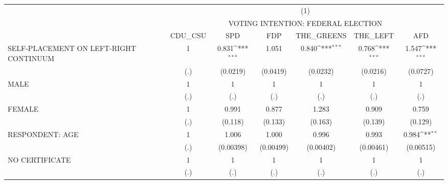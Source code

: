 {
\def\sym#1{\ifmmode^{#1}\else\(^{#1}\)\fi}
\begin{tabular}{l*{6}{c}}
\hline\hline
                              &\multicolumn{6}{c}{(1)}                                                                                                \\
                              &\multicolumn{6}{c}{VOTING INTENTION: FEDERAL ELECTION}                                                                 \\
                              &   CDU\_CSU         &       SPD         &       FDP         &THE\_GREENS         &  THE\_LEFT         &       AFD         \\
\hline
SELF-PLACEMENT ON LEFT-RIGHT CONTINUUM&         1         &     0.831\sym{***}&     1.051         &     0.840\sym{***}&     0.768\sym{***}&     1.547\sym{***}\\
                              &       (.)         &  (0.0219)         &  (0.0419)         &  (0.0232)         &  (0.0216)         &  (0.0727)         \\
[1em]
MALE                          &         1         &         1         &         1         &         1         &         1         &         1         \\
                              &       (.)         &       (.)         &       (.)         &       (.)         &       (.)         &       (.)         \\
[1em]
FEMALE                        &         1         &     0.991         &     0.877         &     1.283         &     0.909         &     0.759         \\
                              &       (.)         &   (0.118)         &   (0.133)         &   (0.163)         &   (0.139)         &   (0.129)         \\
[1em]
RESPONDENT: AGE               &         1         &     1.006         &     1.000         &     0.996         &     0.993         &     0.984\sym{**} \\
                              &       (.)         & (0.00398)         & (0.00499)         & (0.00402)         & (0.00461)         & (0.00515)         \\
[1em]
NO CERTIFICATE                &         1         &         1         &         1         &         1         &         1         &         1         \\
                              &       (.)         &       (.)         &       (.)         &       (.)         &       (.)         &       (.)         \\

\end{tabular}}
